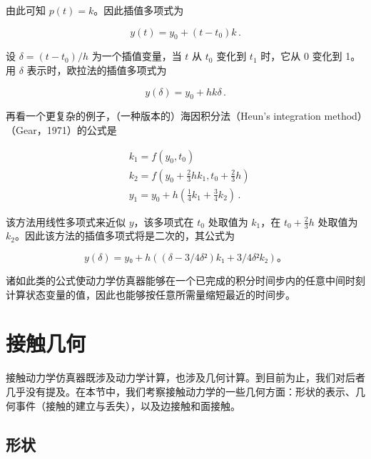 \documentclass[10pt,a4paper]{book}
\theoremstyle{thmstyle} %
\theoremstyle{defstyle} %
\theoremstyle{prostyle} %
\begin{document}
由此可知 $p(t)=k$。因此插值多项式为



$$
y ( t ) = y _ { 0 } + ( t - t _ { 0 } ) k \, .
$$



设 $\delta=(t-t_{0})/h$ 为一个插值变量，当 $t$ 从 $t_{0}$ 变化到 $t_{1}$ 时，它从 0 变化到 1。用 $\delta$ 表示时，欧拉法的插值多项式为



$$
y ( \delta ) = y _ { 0 } + h k \delta \, .
$$



再看一个更复杂的例子，（一种版本的）海因积分法（Heun's integration method）（Gear，1971）的公式是



$$
\begin{array}{rl} & { k _ { 1 } = f ( y _ { 0 } , t _ { 0 } ) } \\& { k _ { 2 } = f ( y _ { 0 } + \frac { 2 } { 3 } h k _ { 1 } , t _ { 0 } + \frac { 2 } { 3 } h ) } \\& { y _ { 1 } = y _ { 0 } + h ( \frac { 1 } { 4 } k _ { 1 } + \frac { 3 } { 4 } k _ { 2 } ) \, . } \end{array}
$$



该方法用线性多项式来近似 $y$，该多项式在 $t_0$ 处取值为 $k_1$，在 $t_0 + \frac{2}{3}h$ 处取值为 $k_2$。因此该方法的插值多项式将是二次的，其公式为



$$
y(δ) = y₀ + h((δ - 3/4δ²)k₁ + 3/4δ²k₂)。
$$



诸如此类的公式使动力学仿真器能够在一个已完成的积分时间步内的任意中间时刻计算状态变量的值，因此也能够按任意所需量缩短最近的时间步。



\section{接触几何}





接触动力学仿真器既涉及动力学计算，也涉及几何计算。到目前为止，我们对后者几乎没有提及。在本节中，我们考察接触动力学的一些几何方面：形状的表示、几何事件（接触的建立与丢失），以及边接触和面接触。



\subsection{形状}
\end{document}
